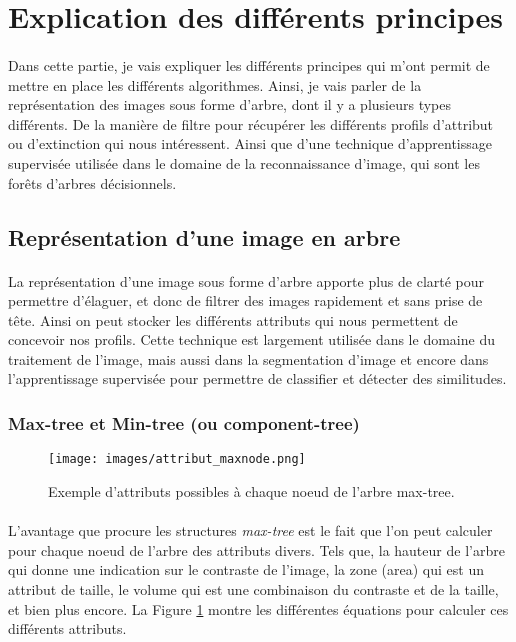\documentclass[paper=a4, 11pt]{article}
\begin{document}
\section{Explication des différents principes}
\paragraph{} Dans cette partie, je vais expliquer les différents principes qui m'ont permit de mettre en place les différents algorithmes. Ainsi, je vais parler de la représentation des images sous forme d'arbre, dont il y a plusieurs types différents. De la manière de filtre pour récupérer les différents profils d'attribut ou d'extinction qui nous intéressent. Ainsi que d'une technique d'apprentissage supervisée utilisée dans le domaine de la reconnaissance d'image, qui sont les forêts d'arbres décisionnels.

\subsection{Représentation d'une image en arbre}
\paragraph{} La représentation d'une image sous forme d'arbre apporte plus de clarté pour permettre d'élaguer, et donc de filtrer des images rapidement et sans prise de tête. Ainsi on peut stocker les différents attributs qui nous permettent de concevoir nos profils. Cette technique est largement utilisée dans le domaine du traitement de l'image, mais aussi dans la segmentation d'image et encore dans l'apprentissage supervisée pour permettre de classifier et détecter des similitudes.

\subsubsection{Max-tree et Min-tree (ou component-tree)}

\begin{figure}[h]
\centering
\texttt{[image: images/attribut\_maxnode.png]}
\caption{Exemple d'attributs possibles à chaque noeud de l'arbre max-tree.}
\label{fig:exempleattrib}
\end{figure}

\paragraph{} L'avantage que procure les structures \textit{max-tree} est le fait que l'on peut calculer pour chaque noeud de l'arbre des attributs divers. Tels que, la hauteur de l'arbre qui donne une indication sur le contraste de l'image, la zone (area) qui est un attribut de taille, le volume qui est une combinaison du contraste et de la taille, et bien plus encore. La Figure \ref{fig:exempleattrib} montre les différentes équations pour calculer ces différents attributs.
\end{document}
